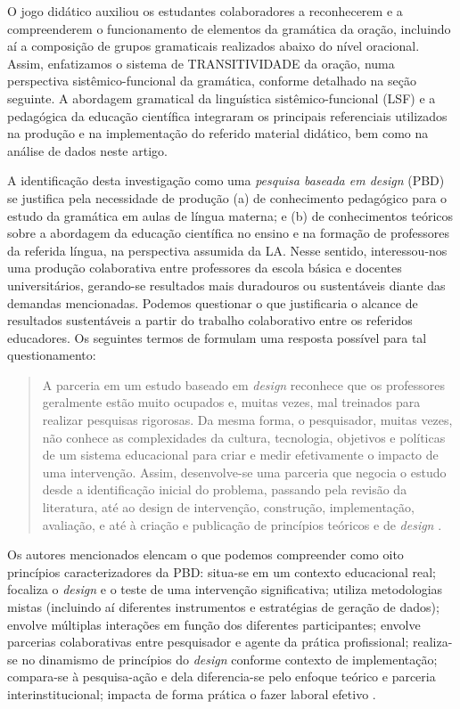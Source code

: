 O jogo didático auxiliou os estudantes colaboradores a reconhecerem e a
compreenderem o funcionamento de elementos da gramática da oração,
incluindo aí a composição de grupos gramaticais realizados abaixo do
nível oracional. Assim, enfatizamos o sistema de TRANSITIVIDADE da
oração, numa perspectiva sistêmico-funcional da gramática, conforme
detalhado na seção seguinte. A abordagem gramatical da linguística
sistêmico-funcional (LSF) \cite{eggins_introduction_2004,halliday_hallidays_2014} e
a pedagógica da educação científica \cite{silva_letramento_2016,silva_educacao_2020a, silva_educacao_2023} integraram os principais referenciais utilizados na produção e na
implementação do referido material didático, bem como na análise de
dados neste artigo.

A identificação desta investigação como uma \emph{pesquisa baseada em
	design} (PBD) se justifica pela necessidade de produção (a) de
conhecimento pedagógico para o estudo da gramática em aulas de língua
materna; e (b) de conhecimentos teóricos sobre a abordagem da educação
científica no ensino e na formação de professores da referida língua, na
perspectiva assumida da LA. Nesse sentido, interessou-nos uma produção
colaborativa entre professores da escola básica e docentes
universitários, gerando-se resultados mais duradouros ou sustentáveis
diante das demandas mencionadas. Podemos questionar o que justificaria o
alcance de resultados sustentáveis a partir do trabalho colaborativo
entre os referidos educadores. Os seguintes termos de \textcite{anderson_design-based_2012} formulam uma resposta possível para tal questionamento:
\begin{quote}
A parceria em um estudo baseado em \emph{design} reconhece que os
professores geralmente estão muito ocupados e, muitas vezes, mal
treinados para realizar pesquisas rigorosas. Da mesma forma, o
pesquisador, muitas vezes, não conhece as complexidades da cultura,
tecnologia, objetivos e políticas de um sistema educacional para criar e
medir efetivamente o impacto de uma intervenção. Assim, desenvolve-se
uma parceria que negocia o estudo desde a identificação inicial do
problema, passando pela revisão da literatura, até ao design de
intervenção, construção, implementação, avaliação, e até à criação e
publicação de princípios teóricos e de \emph{design} \cite[p. 17]{anderson_design-based_2012}.
\end{quote}


Os autores mencionados elencam o que podemos compreender como oito
princípios caracterizadores da PBD: situa-se em um contexto educacional
real; focaliza o \emph{design} e o teste de uma intervenção
significativa; utiliza metodologias mistas (incluindo aí diferentes
instrumentos e estratégias de geração de dados); envolve múltiplas
interações em função dos diferentes participantes; envolve parcerias
colaborativas entre pesquisador e agente da prática profissional;
realiza-se no dinamismo de princípios do \emph{design} conforme contexto
de implementação; compara-se à pesquisa-ação e dela diferencia-se pelo
enfoque teórico e parceria interinstitucional; impacta de forma prática
o fazer laboral efetivo \cite{anderson_design-based_2012}.



